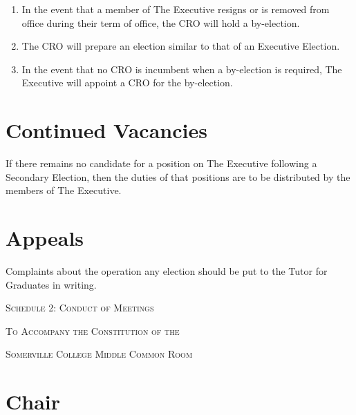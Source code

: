 \documentclass[11pt, a4paper]{article}
\begin{document}
\begin{enumerate}
    \item In the event that a member of The Executive resigns or is removed from office during their term of office, the CRO will hold a by-election.
    \item The CRO will prepare an election similar to that of an Executive Election.
    \item In the event that no CRO is incumbent when a by-election is required, The Executive will appoint a CRO for the by-election.
\end{enumerate}





\section{Continued Vacancies}
\label{sec:continued_vacancies}

If there remains no candidate for a position on The Executive following a Secondary Election, then the duties of that positions are to be distributed by the members of The Executive.





\section{Appeals}
\label{sec:appeals}

Complaints about the operation any election should be put to the Tutor for Graduates in writing.





\clearpage
\setcounter{section}{0}





\centerline{{\Huge \textsc{Schedule 2: Conduct of Meetings}}}
\vspace{2mm}
\centerline{{\Large \textsc{To Accompany the Constitution of the}}}
\vspace{2mm}
\centerline{{\Large \textsc{Somerville College Middle Common Room}}}





\section{Chair}
\label{sec:chair}
\end{document}
